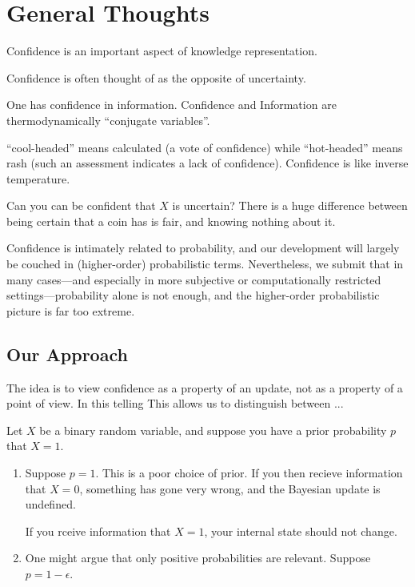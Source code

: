 \documentclass{article}
\begin{document}
\section{General Thoughts}
Confidence is an important aspect of knowledge representation.

Confidence is often thought of as the opposite of uncertainty.


One has confidence in information.
Confidence and Information are thermodynamically ``conjugate variables''.


``cool-headed'' means calculated (a vote of confidence) while ``hot-headed'' means rash (such an assessment indicates a lack of confidence). Confidence is like inverse temperature.

Can you can be confident that $X$ is uncertain?
There is a huge difference between being certain that a coin has is fair, and knowing nothing about it.



Confidence is intimately related to probability, and our development will largely be couched in (higher-order) probabilistic terms.
Nevertheless, we submit that in many cases---and especially in more subjective or computationally restricted settings---probability alone is not enough, and the higher-order probabilistic picture is far too extreme.





\subsection*{Our Approach}
The idea is to view confidence as a property of an update, not as a property of a point of view.
In this telling
This allows us to distinguish between ...

\begin{example}
Let $X$ be a binary random variable, and suppose you have a prior probability $p$ that $X=1$.
\begin{enumerate}
    \item Suppose $p=1$.
    This is a poor choice of prior.
    If you then recieve information that $X=0$, something has gone very wrong, and the Bayesian update is undefined.

    If you rceive information that $X = 1$, your internal state should not change.

    \item One might argue that only positive probabilities are relevant.
    Suppose $p = 1 - \epsilon$.
\end{enumerate}
\end{example}
\end{document}
